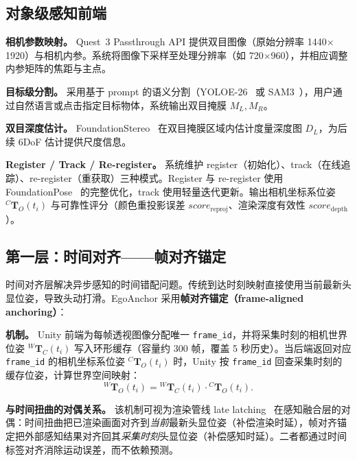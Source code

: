\documentclass[review]{vgtc}
\begin{document}
\subsection{对象级感知前端}

\noindent\textbf{相机参数映射。} Quest~3 Passthrough API 提供双目图像（原始分辨率 1440$\times$1920）与相机内参。系统将图像下采样至处理分辨率（如 720$\times$960），并相应调整内参矩阵的焦距与主点。

\noindent\textbf{目标级分割。} 采用基于 prompt 的语义分割（YOLOE-26~\cite{yoloe2025} 或 SAM3~\cite{sam3_2025}），用户通过自然语言或点击指定目标物体，系统输出双目掩膜 $M_L, M_R$。

\noindent\textbf{双目深度估计。} FoundationStereo~\cite{foundationstereo2025} 在双目掩膜区域内估计度量深度图 $D_L$，为后续 6DoF 估计提供尺度信息。

\noindent\textbf{Register / Track / Re-register。} 系统维护 register（初始化）、track（在线追踪）、re-register（重获取）三种模式。Register 与 re-register 使用 FoundationPose~\cite{foundationpose2023} 的完整优化，track 使用轻量迭代更新。输出相机坐标系位姿 ${}^{C}\mathbf{T}_{O}(t_i)$ 与可靠性评分（颜色重投影误差 $\mathit{score}_{\text{reproj}}$、渲染深度有效性 $\mathit{score}_{\text{depth}}$）。

\subsection{第一层：时间对齐——帧对齐锚定}

时间对齐层解决异步感知的时间错配问题。传统到达时刻映射直接使用当前最新头显位姿，导致头动打滑。EgoAnchor 采用\textbf{帧对齐锚定（frame-aligned anchoring）}：

\noindent\textbf{机制。} Unity 前端为每帧透视图像分配唯一 \texttt{frame\_id}，并将采集时刻的相机世界位姿 ${}^{W}\mathbf{T}_{C}(t_i)$ 写入环形缓存（容量约 300 帧，覆盖 5 秒历史）。当后端返回对应 \texttt{frame\_id} 的相机坐标系位姿 ${}^{C}\mathbf{T}_{O}(t_i)$ 时，Unity 按 \texttt{frame\_id} 回查采集时刻的缓存位姿，计算世界空间映射：
\begin{equation}
  {}^{W}\mathbf{T}_{O}(t_i) = {}^{W}\mathbf{T}_{C}(t_i) \cdot {}^{C}\mathbf{T}_{O}(t_i).
  \label{eq:frame-aligned}
\end{equation}

\noindent\textbf{与时间扭曲的对偶关系。} 该机制可视为渲染管线 late latching~\cite{vanwaveren2016atw,mark1997postrendering} 在感知融合层的对偶：时间扭曲把已渲染画面对齐到\emph{当前}最新头显位姿（补偿渲染时延），帧对齐锚定把外部感知结果对齐回其\emph{采集时刻}头显位姿（补偿感知时延）。二者都通过时间标签对齐消除运动误差，而不依赖预测。
\end{document}
